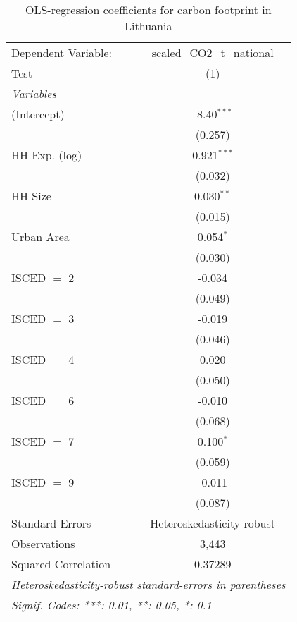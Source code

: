 
\begin{table}[htbp!]
   \centering
   \small
   \begin{adjustbox}{width = 1\textwidth, max height = 0.95\textheight, center}
      \begin{threeparttable}[b]
         \caption{\label{tab:OLS_2_LTU} OLS-regression coefficients for carbon footprint in Lithuania}
         \begin{tabular}{lc}
            \tabularnewline \midrule \midrule
            Dependent Variable: & scaled\_CO2\_t\_national\\     
            Test                & (1)\\  
            \midrule
            \emph{Variables}\\
            (Intercept)         & -8.40$^{***}$\\   
                                & (0.257)\\   
            HH Exp. (log)       & 0.921$^{***}$\\   
                                & (0.032)\\   
            HH Size             & 0.030$^{**}$\\   
                                & (0.015)\\   
            Urban Area          & 0.054$^{*}$\\   
                                & (0.030)\\   
            ISCED $=$ 2         & -0.034\\   
                                & (0.049)\\   
            ISCED $=$ 3         & -0.019\\   
                                & (0.046)\\   
            ISCED $=$ 4         & 0.020\\   
                                & (0.050)\\   
            ISCED $=$ 6         & -0.010\\   
                                & (0.068)\\   
            ISCED $=$ 7         & 0.100$^{*}$\\   
                                & (0.059)\\   
            ISCED $=$ 9         & -0.011\\   
                                & (0.087)\\   
            \midrule 
            Standard-Errors     & Heteroskedasticity-robust \\   
            Observations        & 3,443\\  
            Squared Correlation & 0.37289\\  
            \midrule \midrule
            \multicolumn{2}{l}{\emph{Heteroskedasticity-robust standard-errors in parentheses}}\\
            \multicolumn{2}{l}{\emph{Signif. Codes: ***: 0.01, **: 0.05, *: 0.1}}\\
         \end{tabular}
         

\end{threeparttable}
\end{adjustbox}
\end{table}
